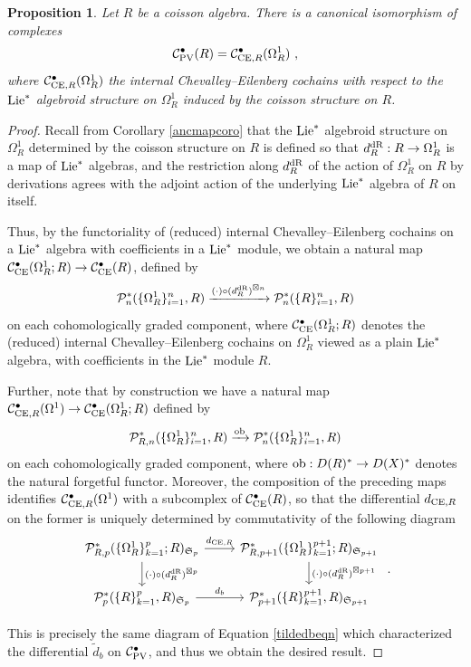 \documentclass[11pt]{amsart}
\numberwithin{equation}{section}
\newtheorem{prop}[theo]{Proposition}
\theoremstyle{definition}
\newcommand{\mc}{\mathcal}
\newcommand{\mf}{\mathfrak}
\newcommand{\ob}{{\textup{ob}}}
\newcommand{\CE}{{\textup{CE}}}
\newcommand{\dR}{{\textup{dR}}}
\newcommand{\Lie}{{\textup{Lie}}}
\newcommand{\Ss}{{{\mf{S}}}}
\newcommand{\PV}{{{\textup{PV}}}}
\newcommand{\0}{{\textbf{0}}}
\newcommand{\DD}{{D}}
\def \mf{\mathfrak}
\begin{document}
\begin{prop}\label{PVCEprop} Let $R$ be a coisson algebra. There is a canonical isomorphism of complexes
	\[ \mc C_\PV^\bullet(R)  = \mc C_{\CE,R}^{\bullet}(\Omega^1_R) \ ,\]
where $\mc C_{\CE,R}^{\bullet}(\Omega^1_R)$ the internal Chevalley--Eilenberg cochains with respect to the $\Lie^*$ algebroid structure on $\Omega^1_R$ induced by the coisson structure on $R$.
\end{prop}
\begin{proof}
Recall from Corollary \ref{ancmapcoro} that the $\Lie^*$ algebroid structure on $\Omega^1_R$ determined by the coisson structure on $R$ is defined so that $d_R^\dR:R\to \Omega^1_R$ is a map of $\Lie^*$ algebras, and the restriction along $d_R^\dR$ of the action of $\Omega^1_R$ on $R$ by derivations agrees with the adjoint action of the underlying $\Lie^*$ algebra of $R$ on itself.

Thus, by the functoriality of (reduced) internal Chevalley--Eilenberg cochains on a $\Lie^*$ algebra with coefficients in a $\Lie^*$ module, we obtain a natural map $\mc C_\CE^\bullet(\Omega^1_R;R) \to \mc C_\CE^\bullet(R)$, defined by
\[   \mc P_{n}^*(\{\Omega^1_R\}_{i=1}^n, R) \xrightarrow{(\cdot)\circ (d_R^\dR)^{\boxtimes n}} \mc P_{n}^*(\{R\}_{i=1}^n, R) \]
on each cohomologically graded component, where $\mc C_\CE^\bullet(\Omega^1_R;R)$ denotes the (reduced) internal Chevalley--Eilenberg cochains on $\Omega^1_R$ viewed as a plain $\Lie^*$ algebra, with coefficients in the $\Lie^*$ module $R$.

Further, note that by construction we have a natural map $\mc C_{\CE,R}^\bullet(\Omega^1) \to \mc C_\CE^\bullet(\Omega^1_R;R)$ defined by
\[\mc P_{R,n}^*(\{\Omega^1_R\}_{i=1}^n, R) \xrightarrow{\ob} \mc P_{n}^*(\{\Omega^1_R\}_{i=1}^n, R) \]
on each cohomologically graded component, where $\ob:\DD(R)^*\to \DD(X)^*$ denotes the natural forgetful functor.
Moreover, the composition of the preceding maps identifies $\mc C_{\CE,R}^\bullet(\Omega^1) $ with a subcomplex of $\mc C^\bullet_\CE(R)$, so that the differential $d_{\CE,R}$ on the former is uniquely determined by commutativity of the following diagram
\[
\begin{tikzcd}
			\mc P^*_{R,p}(\{\Omega^1_R \}_{k=1}^{p};R)_{\Ss_{p}} \arrow[r,"d_{\CE,R}"] \arrow[d," (\cdot)\circ (d_R^{\dR})^{\boxtimes p}"] & \mc P^*_{R,p+1}(\{\Omega^1_R \}_{k=1}^{p+1};R)_{\Ss_{p+1}}  \arrow[d," (\cdot)\circ (d_R^{\dR})^{\boxtimes p+1}"]\\
			\mc P^*_p(\{R\}_{k=1}^p,R)_{\Ss_{p}} \arrow[r,"d_b"]&  	\mc P^*_{p+1}(\{R\}_{k=1}^{p+1},R)_{\Ss_{p+1}} 	\end{tikzcd}  \ .\]

This is precisely the same diagram of Equation \ref{tildedbeqn} which characterized the differential $\tilde d_b$ on $\mc C^\bullet_\PV$, and thus we obtain the desired result.
\end{proof}
\end{document}
